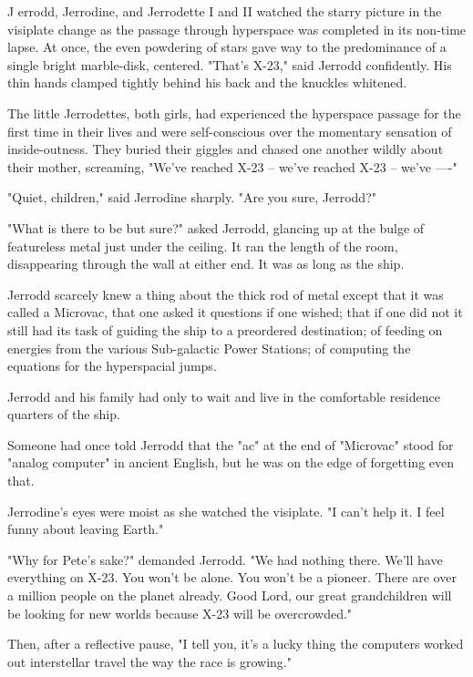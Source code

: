 \documentclass[11pt,twocolumn,paper=a5,pagesize]{article}
\newcommand{\futureone}[1]{ #1 }
\newcommand{\initial}[1]{ \lettrine[lines=3,lhang=0.3,nindent=0em]{  {\textsf{#1}}}{}}
\newcommand{\initialb}[1]{ \lettrine[lines=3,lhang=0.3,nindent=1em]{  {\textsf{#1}}}{}}
\begin{document}
\futureone{
\initial{J}
errodd, Jerrodine, and Jerrodette I and II watched the starry picture in the visiplate change as the passage through hyperspace was completed in its non-time lapse. At once, the even powdering of stars gave way to the predominance of a single bright marble-disk, centered.
"That's X-23," said Jerrodd confidently. His thin hands clamped tightly behind his back and the knuckles whitened.

The little Jerrodettes, both girls, had experienced the hyperspace passage for the first time in their lives and were self-conscious over the momentary sensation of inside-outness. They buried their giggles and chased one another wildly about their mother, screaming, "We've reached X-23 -- we've reached X-23 -- we've ----"

"Quiet, children," said Jerrodine sharply. "Are you sure, Jerrodd?"

"What is there to be but sure?" asked Jerrodd, glancing up at the bulge of featureless metal just under the ceiling. It ran the length of the room, disappearing through the wall at either end. It was as long as the ship.

Jerrodd scarcely knew a thing about the thick rod of metal except that it was called a Microvac, that one asked it questions if one wished; that if one did not it still had its task of guiding the ship to a preordered destination; of feeding on energies from the various Sub-galactic Power Stations; of computing the equations for the hyperspacial jumps.

Jerrodd and his family had only to wait and live in the comfortable residence quarters of the ship.

Someone had once told Jerrodd that the "ac" at the end of "Microvac" stood for "analog computer" in ancient English, but he was on the edge of forgetting even that.

Jerrodine's eyes were moist as she watched the visiplate. "I can't help it. I feel funny about leaving Earth."

"Why for Pete's sake?" demanded Jerrodd. "We had nothing there. We'll have everything on X-23. You won't be alone. You won't be a pioneer. There are over a million people on the planet already. Good Lord, our great grandchildren will be looking for new worlds because X-23 will be overcrowded."

Then, after a reflective pause, "I tell you, it's a lucky thing the computers worked out interstellar travel the way the race is growing."

}
\end{document}

